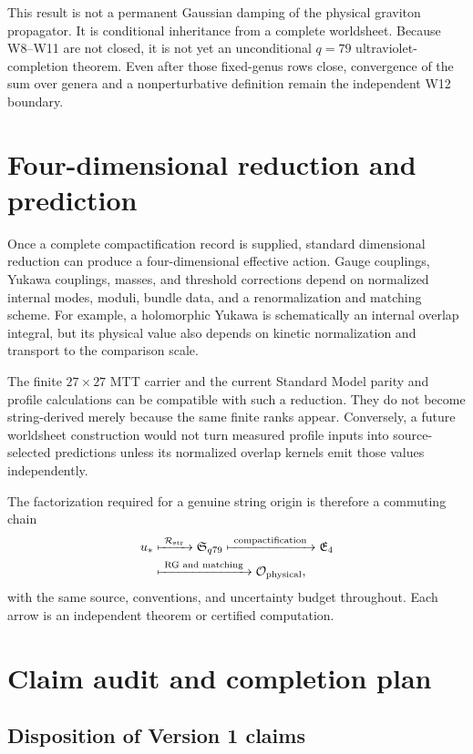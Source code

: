 \documentclass[11pt]{article}
\theoremstyle{definition}
\theoremstyle{remark}
\newcommand{\cO}{\mathcal O}
\newcommand{\cR}{\mathcal R}
\begin{document}
This result is not a permanent Gaussian damping of the physical graviton
propagator.  It is conditional inheritance from a complete worldsheet.
Because W8--W11 are not closed, it is not yet an unconditional \(q=79\)
ultraviolet-completion theorem.  Even after those fixed-genus rows close,
convergence of the sum over genera and a nonperturbative definition remain
the independent W12 boundary.

\section{Four-dimensional reduction and prediction}
\label{sec:eft}

Once a complete compactification record is supplied, standard dimensional
reduction can produce a four-dimensional effective action.  Gauge couplings,
Yukawa couplings, masses, and threshold corrections depend on normalized
internal modes, moduli, bundle data, and a renormalization and matching
scheme.  For example, a holomorphic Yukawa is schematically an internal
overlap integral, but its physical value also depends on kinetic
normalization and transport to the comparison scale.

The finite \(27\times27\) MTT carrier and the current Standard Model parity
and profile calculations can be compatible with such a reduction.  They do
not become string-derived merely because the same finite ranks appear.
Conversely, a future worldsheet construction would not turn measured profile
inputs into source-selected predictions unless its normalized overlap
kernels emit those values independently.

The factorization required for a genuine string origin is therefore a
commuting chain
\[
\begin{split}
u_\ast
&\xmapsto{\ \cR_{\mathrm{str}}\ }
\mathfrak S_{q79}
\xmapsto{\ \text{compactification}\ }
\mathfrak E_4\\
&\xmapsto{\ \text{RG and matching}\ }
\cO_{\mathrm{physical}},
\end{split}
\]
with the same source, conventions, and uncertainty budget throughout.  Each
arrow is an independent theorem or certified computation.

\section{Claim audit and completion plan}
\label{sec:boundary}

\subsection{Disposition of Version 1 claims}
\end{document}
